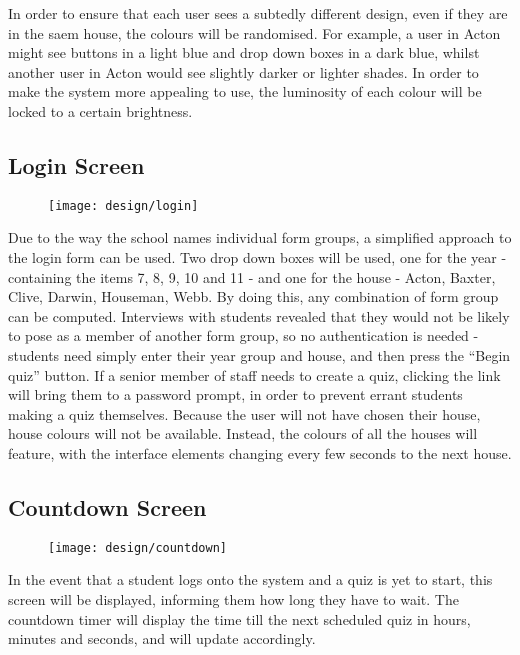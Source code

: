 In order to ensure that each user sees a subtedly different design, even if they are in the saem house, the colours will be randomised. For example, a user in Acton might see buttons in a light blue and drop down boxes in a dark blue, whilst another user in Acton would see slightly darker or lighter shades. In order to make the system more appealing to use, the luminosity of each colour will be locked to a certain brightness.



\subsection{Login Screen}
\begin{figure}[h!]
  \texttt{[image: design/login]}
\end{figure}

Due to the way the school names individual form groups, a simplified approach to the login form can be used. Two drop down boxes will be used, one for the year - containing the items 7, 8, 9, 10 and 11 - and one for the house - Acton, Baxter, Clive, Darwin, Houseman, Webb. By doing this, any combination of form group can be computed. Interviews with students revealed that they would not be likely to pose as a member of another form group, so no authentication is needed - students need simply enter their year group and house, and then press the ``Begin quiz'' button. If a senior member of staff needs to create a quiz, clicking the link will bring them to a password prompt, in order to prevent errant students making a quiz themselves. Because the user will not have chosen their house, house colours will not be available. Instead, the colours of all the houses will feature, with the interface elements changing every few seconds to the next house.

\clearpage

\subsection{Countdown Screen}
\begin{figure}[h!]
  \texttt{[image: design/countdown]}
\end{figure}

In the event that a student logs onto the system and a quiz is yet to start, this screen will be displayed, informing them how long they have to wait. The countdown timer will display the time till the next scheduled quiz in hours, minutes and seconds, and will update accordingly.

